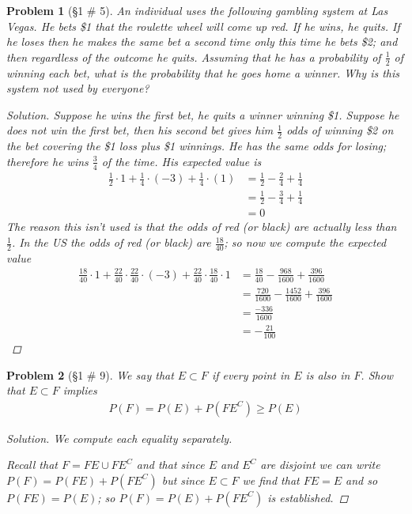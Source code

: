 \documentclass[11pt, oneside]{book}   	%
\newtheorem{problem}{Problem}[chapter]
\begin{document}
\begin{spacing}{1.618}
\begin{problem}[\S 1 \# 5]
	An individual uses the following gambling system at Las Vegas. He bets \$1 that the roulette wheel will come up red. If he wins, he quits. If he loses then he makes the same bet a second time only this time he bets \$2; and then regardless of the outcome he quits. Assuming that he has a probability of $\frac{1}{2}$ of winning each bet, what is the probability that he goes home a winner. Why is this system not used by everyone? 
	\begin{proof}[Solution]
		Suppose he wins the first bet, he quits a winner winning \$1. Suppose he does not win the first bet, then his second bet gives him $\frac{1}{2}$ odds of winning \$2 on the bet covering the \$1 loss plus \$1 winnings. He has the same odds for losing; therefore he wins $\frac{3}{4}$ of the time. His expected value is 
		\begin{alignat*}{4}
			\frac{1}{2}\cdot 1 + \frac{1}{4}\cdot (-3) + \frac{1}{4}\cdot (1) &= \frac{1}{2} - \frac{2}{4} + \frac{1}{4} \\
				&=\frac{1}{2} - \frac{3}{4} + \frac{1}{4} \\
				&=0
		\end{alignat*}
		The reason this isn't used is that the odds of red (or black) are actually less than $\frac{1}{2}$. In the US the odds of red (or black) are $\frac{18}{40}$; so now we compute the expected value
		\begin{alignat*}{4}
			\frac{18}{40}\cdot 1 + \frac{22}{40}\cdot\frac{22}{40}\cdot (-3) + \frac{22}{40}\cdot\frac{18}{40} \cdot 1 &=\frac{18}{40}-\frac{968}{1600} + \frac{396}{1600} \\
				&=\frac{720}{1600} - \frac{1452}{1600} + \frac{396}{1600} \\
				&=\frac{-336}{1600} \\
				&=-\frac{21}{100}
		\end{alignat*}
	\end{proof}
\end{problem}

\begin{problem}[\S 1 \# 9]
	We say that $E \subset F$ if every point in $E$ is also in $F$. Show that $E\subset F$ implies 
	\begin{alignat}{4}
		P(F)=P(E) + P\left(FE^C\right) \geq P(E)
	\end{alignat}
	\begin{proof}[Solution]
		We compute each equality separately. 
		
		Recall that $F=FE \cup FE^C$ and that since $E$ and $E^C$ are disjoint we can write $P(F)=P(FE) + P\left(FE^C\right)$ but since $E\subset F$ we find that $FE = E$ and so $P(FE)=P(E)$; so $P(F)=P(E)+P\left(FE^C\right)$ is established. 
		

\end{proof}
\end{problem}
\end{spacing}
\end{document}
